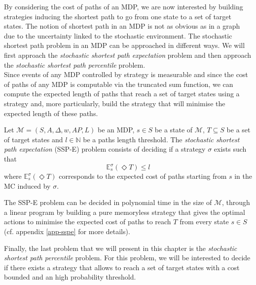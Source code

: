 By considering the cost of paths of an MDP, we are now interested by building
strategies inducing the shortest path to go from one state to a set of target
states. The notion of shortest path in an MDP is not as obvious as in a graph due to the uncertainty linked to the stochastic environment.
The stochastic shortest path problem in an MDP can be approached in different
ways. We will first approach the \textit{stochastic shortest path expectation} problem and
then approach the \textit{stochastic shortest path percentile} problem. \\

Since events of any MDP controlled by strategy is measurable and
since the cost of paths of any MDP is computable via the truncated sum function, we can
compute the expected length of paths that reach a set of target states using a strategy and, more particularly, build the strategy that will minimise the expected length of these paths.

\begin{definition}
Let $\mathcal{M}=(S, A, \Delta, w, AP, L)$ be an MDP, $s \in S$ be a state of $\mathcal{M}$,
$T \subseteq S$ be a set of target states and $l \in \mathbb{N}$ be a paths length
threshold. The \textit{stochastic shortest path expectation} (SSP-E) problem
consists of deciding if a strategy $\sigma$ exists such that
\[
  \mathbb{E}^\sigma_s(\Diamond T) \leq l
\]
where $\mathbb{E}_s^\sigma(\Diamond T)$ corresponds to the expected cost of paths starting from $s$ in the MC induced by $\sigma$.
\end{definition}

\begin{theorem}
  The SSP-E problem can be decided in polynomial time in the size of $\mathcal{M}$, through a linear program by building a pure memoryless strategy that gives the optimal actions to minimise the expected cost of paths to reach $T$ from every state $s \in S$ (cf. appendix \ref{app-sspe} for more details).
\end{theorem}

Finally, the last problem that we will present in this chapter is the
\textit{stochastic shortest path percentile} problem. For this problem, we will
be interested to decide if there exists a strategy that allows to reach a set of target states with
a cost bounded and an high probability threshold.

